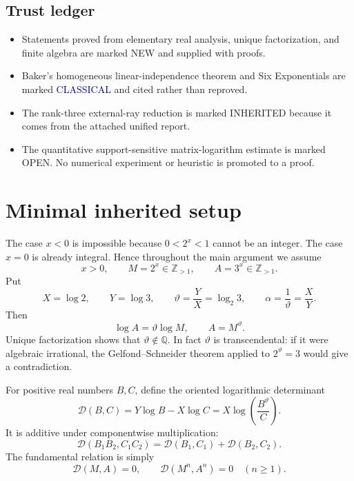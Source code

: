 \documentclass[11pt]{article}
\theoremstyle{definition}
\newcommand{\Q}{\mathbb Q}
\newcommand{\Z}{\mathbb Z}
\newcommand{\vtheta}{\vartheta}
\newcommand{\Dlog}{\mathscr D}
\newcommand{\newtag}{\textcolor{newgreen}{\textsf{NEW}}}
\newcommand{\inheritedtag}{\textcolor{bluegray}{\textsf{INHERITED}}}
\newcommand{\classtag}{\textcolor{navy}{\textsf{CLASSICAL}}}
\newcommand{\opentag}{\textcolor{openorange}{\textsf{OPEN}}}
\begin{document}
\subsection{Trust ledger}

\begin{aestatusbox}
\begin{itemize}
\item Statements proved from elementary real analysis, unique factorization, and finite
algebra are marked \newtag{} and supplied with proofs.
\item Baker's homogeneous linear-independence theorem and Six Exponentials are marked
\classtag{} and cited rather than reproved.
\item The rank-three external-ray reduction is marked \inheritedtag{} because it comes
from the attached unified report.
\item The quantitative support-sensitive matrix-logarithm estimate is marked \opentag{}.
No numerical experiment or heuristic is promoted to a proof.
\end{itemize}
\end{aestatusbox}

\section{Minimal inherited setup}\label{sec:minimal-setup}

The case $x<0$ is impossible because $0<2^x<1$ cannot be an integer.  The case $x=0$ is
already integral.  Hence throughout the main argument we assume
\begin{equation}\label{eq:basic}
 x>0,\qquad M=2^x\in\Z_{>1},\qquad A=3^x\in\Z_{>1}.
\end{equation}
Put
\begin{equation}\label{eq:theta-alpha}
 X=\log2,\qquad Y=\log3,\qquad
 \vtheta=\frac{Y}{X}=\log_2 3,
 \qquad \alpha=\frac1{\vtheta}=\frac{X}{Y}.
\end{equation}
Then
\begin{equation}\label{eq:power-curve}
 \log A=\vtheta\log M,
 \qquad A=M^{\vtheta}.
\end{equation}
Unique factorization shows that $\vtheta\notin\Q$.  In fact $\vtheta$ is transcendental:
if it were algebraic irrational, the Gelfond--Schneider theorem applied to
$2^{\vtheta}=3$ would give a contradiction.

For positive real numbers $B,C$, define the oriented logarithmic determinant
\begin{equation}\label{eq:Dlog}
 \Dlog(B,C)=Y\log B-X\log C
 =X\log\left(\frac{B^{\vtheta}}{C}\right).
\end{equation}
It is additive under componentwise multiplication:
\begin{equation}\label{eq:Dlog-add}
 \Dlog(B_1B_2,C_1C_2)=\Dlog(B_1,C_1)+\Dlog(B_2,C_2).
\end{equation}
The fundamental relation is simply
\begin{equation}\label{eq:Dlog-base-zero}
 \Dlog(M,A)=0,
 \qquad \Dlog(M^n,A^n)=0\quad(n\ge1).
\end{equation}
\end{document}
